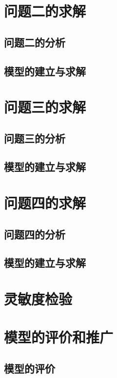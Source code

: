 \documentclass{cumcmthesis}
\begin{document}
\section{问题二的求解}

\subsection{问题二的分析}

\subsection{模型的建立与求解}


\section{问题三的求解}

\subsection{问题三的分析}


\subsection{模型的建立与求解}


\section{问题四的求解}

\subsection{问题四的分析}
        

\subsection{模型的建立与求解}


\section{灵敏度检验}

\section{模型的评价和推广}
\subsection{模型的评价}
\end{document}
